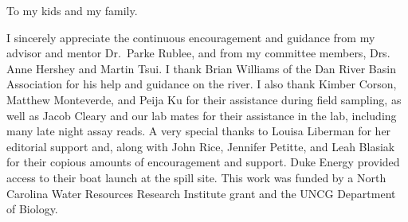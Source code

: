 \documentclass[ms, hidelinks]{uncgdissertationexp}
\theoremstyle{plain}
\theoremstyle{definition}
\theoremstyle{remark}
\begin{document}
\begin{dedication}
  To my kids and my family.
\end{dedication}
\makeapprovalpage


\begin{acknowledgments}
\setlength{\parindent}{0.5in}
  I sincerely appreciate the continuous encouragement and guidance from my advisor and mentor Dr.~Parke Rublee, and from my committee members, Drs. Anne Hershey and Martin Tsui. I thank Brian Williams of the Dan River Basin Association for his help and guidance on the river. I also thank Kimber Corson, Matthew Monteverde, and Peija Ku for their assistance during field sampling, as well as Jacob Cleary and our lab mates for their assistance in the lab, including many late night assay reads. A very special thanks to Louisa Liberman for her editorial support and, along with John Rice, Jennifer Petitte, and Leah Blasiak for their copious amounts of encouragement and support. Duke Energy provided access to their boat launch at the spill site. This work was funded by a North Carolina Water Resources Research Institute grant and the UNCG Department of Biology.
\end{acknowledgments}
\end{document}
